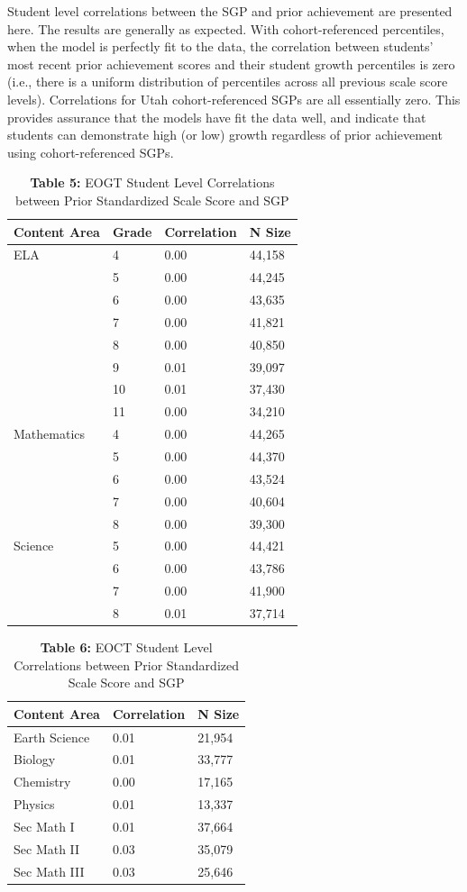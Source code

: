 \documentclass[12pt]{article}
\begin{document}
Student level correlations between the SGP and prior achievement are
presented here. The results are generally as expected. With
cohort-referenced percentiles, when the model is perfectly fit to the
data, the correlation between students' most recent prior achievement
scores and their student growth percentiles is zero (i.e., there is a
uniform distribution of percentiles across all previous scale score
levels). Correlations for Utah cohort-referenced SGPs are all
essentially zero. This provides assurance that the models have fit the
data well, and indicate that students can demonstrate high (or low)
growth regardless of prior achievement using cohort-referenced SGPs.

\begin{table}[H]
\caption*{\textbf{Table 5:} EOGT Student Level Correlations between Prior Standardized Scale Score and SGP\label{table5}} 
\begin{center}
\begin{tabular}{llll}
\hline\hline
\multicolumn{1}{c}{Content Area}&\multicolumn{1}{c}{Grade}&\multicolumn{1}{c}{Correlation}&\multicolumn{1}{c}{N Size}\tabularnewline
\hline
ELA& 4&0.00&44,158\tabularnewline
& 5&0.00&44,245\tabularnewline
& 6&0.00&43,635\tabularnewline
& 7&0.00&41,821\tabularnewline
& 8&0.00&40,850\tabularnewline
& 9&0.01&39,097\tabularnewline
&10&0.01&37,430\tabularnewline
&11&0.00&34,210\tabularnewline
Mathematics& 4&0.00&44,265\tabularnewline
& 5&0.00&44,370\tabularnewline
& 6&0.00&43,524\tabularnewline
& 7&0.00&40,604\tabularnewline
& 8&0.00&39,300\tabularnewline
Science& 5&0.00&44,421\tabularnewline
& 6&0.00&43,786\tabularnewline
& 7&0.00&41,900\tabularnewline
& 8&0.01&37,714\tabularnewline
\hline
\end{tabular}\end{center}

\end{table}

\begin{table}[H]
\caption*{\textbf{Table 6:} EOCT Student Level Correlations between Prior Standardized Scale Score and SGP\label{table6}} 
\begin{center}
\begin{tabular}{lll}
\hline\hline
\multicolumn{1}{c}{Content Area}&\multicolumn{1}{c}{Correlation}&\multicolumn{1}{c}{N Size}\tabularnewline
\hline
Earth Science&0.01&21,954\tabularnewline
Biology&0.01&33,777\tabularnewline
Chemistry&0.00&17,165\tabularnewline
Physics&0.01&13,337\tabularnewline
Sec Math I&0.01&37,664\tabularnewline
Sec Math II&0.03&35,079\tabularnewline
Sec Math III&0.03&25,646\tabularnewline
\hline
\end{tabular}\end{center}

\end{table}
\end{document}
